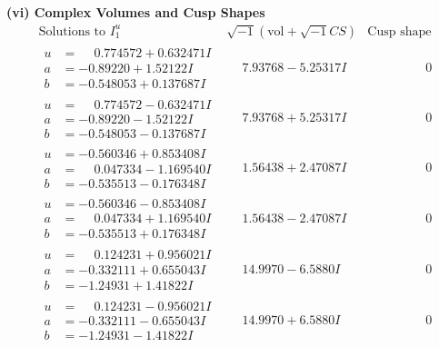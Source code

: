 \documentclass[1p]{elsarticle_modified}
\theoremstyle{definition}
\newcommand{\I}{\sqrt{-1}}
\begin{document}
\newpage\flushleft \textbf{(vi) Complex Volumes and Cusp Shapes}
$$\begin{array}{c|c|c}  
\text{Solutions to }I^u_{1}& \I (\text{vol} + \sqrt{-1}CS) & \text{Cusp shape}\\
 \hline 
\begin{aligned}
u &= \phantom{-}0.774572 + 0.632471 I \\
a &= -0.89220 + 1.52122 I \\
b &= -0.548053 + 0.137687 I\end{aligned}
 & \phantom{-}7.93768 - 5.25317 I & \phantom{-0.000000 } 0 \\ \hline\begin{aligned}
u &= \phantom{-}0.774572 - 0.632471 I \\
a &= -0.89220 - 1.52122 I \\
b &= -0.548053 - 0.137687 I\end{aligned}
 & \phantom{-}7.93768 + 5.25317 I & \phantom{-0.000000 } 0 \\ \hline\begin{aligned}
u &= -0.560346 + 0.853408 I \\
a &= \phantom{-}0.047334 - 1.169540 I \\
b &= -0.535513 - 0.176348 I\end{aligned}
 & \phantom{-}1.56438 + 2.47087 I & \phantom{-0.000000 } 0 \\ \hline\begin{aligned}
u &= -0.560346 - 0.853408 I \\
a &= \phantom{-}0.047334 + 1.169540 I \\
b &= -0.535513 + 0.176348 I\end{aligned}
 & \phantom{-}1.56438 - 2.47087 I & \phantom{-0.000000 } 0 \\ \hline\begin{aligned}
u &= \phantom{-}0.124231 + 0.956021 I \\
a &= -0.332111 + 0.655043 I \\
b &= -1.24931 + 1.41822 I\end{aligned}
 & \phantom{-}14.9970 - 6.5880 I & \phantom{-0.000000 } 0 \\ \hline\begin{aligned}
u &= \phantom{-}0.124231 - 0.956021 I \\
a &= -0.332111 - 0.655043 I \\
b &= -1.24931 - 1.41822 I\end{aligned}
 & \phantom{-}14.9970 + 6.5880 I & \phantom{-0.000000 } 0 \\ \hline\begin{aligned}

\end{aligned}
\end{array}$$
\end{document}
